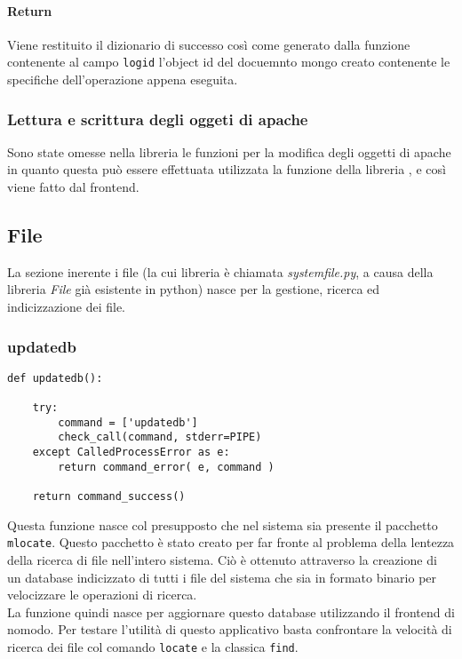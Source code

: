 \documentclass[11pt]{article}
\begin{document}
\paragraph{Return}
Viene restituito il dizionario di successo così come generato dalla funzione  contenente
al campo \texttt{logid} l'object id del docuemnto mongo creato contenente le specifiche dell'operazione appena eseguita.

\subsubsection{Lettura e scrittura degli oggeti di apache}\label{apacheobjectswrite}
Sono state omesse nella libreria le funzioni per la modifica degli oggetti di apache in quanto questa può essere effettuata
utilizzata la funzione  della libreria , e così viene fatto dal frontend.

\subsection{File}\label{systemfile}
La sezione inerente i file (la cui libreria è chiamata \textit{systemfile.py}, a causa della libreria \textit{File}
già esistente in python) nasce per la gestione, ricerca ed indicizzazione dei file.
\subsubsection{updatedb}\label{updatedb}
\begin{lstlisting}
def updatedb():

    try:
        command = ['updatedb']
        check_call(command, stderr=PIPE)
    except CalledProcessError as e:
        return command_error( e, command )

    return command_success()
\end{lstlisting}
Questa funzione nasce col presupposto che nel sistema sia presente il pacchetto \texttt{mlocate}. Questo pacchetto
è stato creato per far fronte al problema della lentezza della ricerca di file nell'intero sistema. Ciò è
ottenuto attraverso la creazione di un database indicizzato di tutti i file del sistema che sia in formato
binario per velocizzare le operazioni di ricerca.\\
La funzione quindi nasce per aggiornare questo database utilizzando il frontend di nomodo. Per testare
l'utilità di questo applicativo basta confrontare la velocità di ricerca dei file col comando \texttt{locate}
e la classica \texttt{find}.
\end{document}
